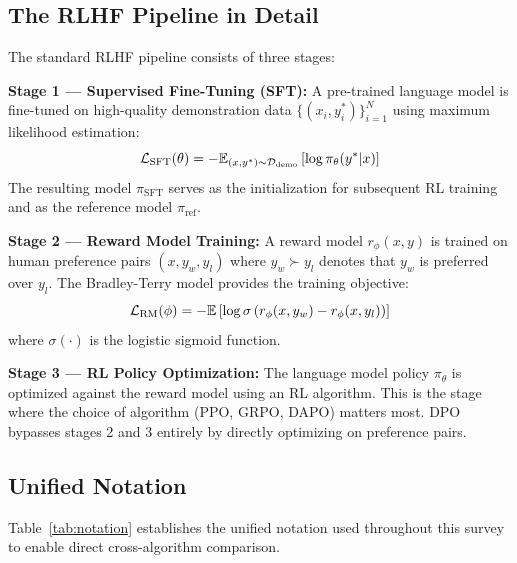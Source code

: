\subsection{The RLHF Pipeline in Detail}

The standard RLHF pipeline consists of three stages:

\textbf{Stage 1 --- Supervised Fine-Tuning (SFT):} A pre-trained language model is fine-tuned on high-quality demonstration data $\{(x_i, y_i^*)\}_{i=1}^{N}$ using maximum likelihood estimation:
\begin{equation}
\mathcal{L}_{\text{SFT}}(\theta) = -\mathbb{E}_{(x,y^*) \sim \mathcal{D}_{\text{demo}}}\left[\log \pi_\theta(y^*|x)\right]
\end{equation}
The resulting model $\pi_{\text{SFT}}$ serves as the initialization for subsequent RL training and as the reference model $\pi_{\text{ref}}$.

\textbf{Stage 2 --- Reward Model Training:} A reward model $r_\phi(x, y)$ is trained on human preference pairs $(x, y_w, y_l)$ where $y_w \succ y_l$ denotes that $y_w$ is preferred over $y_l$. The Bradley-Terry model provides the training objective:
\begin{equation}
\mathcal{L}_{\text{RM}}(\phi) = -\mathbb{E}\left[\log \sigma\left(r_\phi(x, y_w) - r_\phi(x, y_l)\right)\right]
\end{equation}
where $\sigma(\cdot)$ is the logistic sigmoid function.

\textbf{Stage 3 --- RL Policy Optimization:} The language model policy $\pi_\theta$ is optimized against the reward model using an RL algorithm. This is the stage where the choice of algorithm (PPO, GRPO, DAPO) matters most. DPO bypasses stages 2 and 3 entirely by directly optimizing on preference pairs.

\subsection{Unified Notation}

Table~\ref{tab:notation} establishes the unified notation used throughout this survey to enable direct cross-algorithm comparison.

